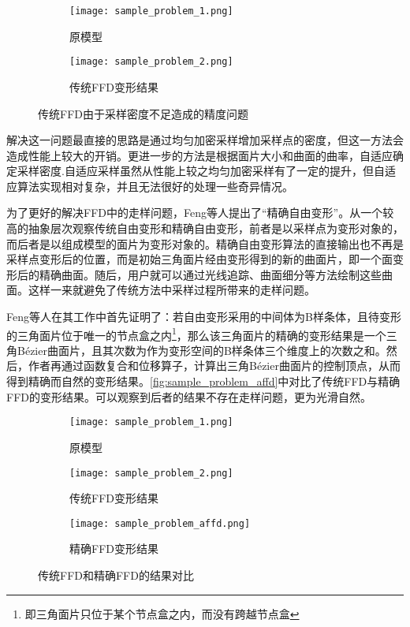 \begin{figure}[htbp]
	\centering
	\begin{subfigure}[b]{.4\textwidth}
		\centering
		\texttt{[image: sample\_problem\_1.png]}
		\caption{原模型}\label{subfig:sample_problem_0}
	\end{subfigure}
	\quad
	\begin{subfigure}[b]{.4\textwidth}
		\centering
		\texttt{[image: sample\_problem\_2.png]}
		\caption{传统FFD变形结果}\label{subfig:sample_problem_1}
	\end{subfigure}
    \caption{传统FFD由于采样密度不足造成的精度问题}\label{fig:sample_problem}
\end{figure}

    解决这一问题最直接的思路是通过均匀加密采样增加采样点的密度，但这一方法会造成性能上较大的开销。更进一步的方法\cite{parry1986, gain1999, griessmair1989deformation}是根据面片大小和曲面的曲率，自适应确定采样密度.自适应采样虽然从性能上较之均匀加密采样有了一定的提升，但自适应算法实现相对复杂，并且无法很好的处理一些奇异情况。

    为了更好的解决FFD中的走样问题，Feng等人\cite{Feng98}提出了“精确自由变形”。从一个较高的抽象层次观察传统自由变形和精确自由变形，前者是以采样点为变形对象的，而后者是以组成模型的面片为变形对象的。精确自由变形算法的直接输出也不再是采样点变形后的位置，而是初始三角面片经由变形得到的新的曲面片，即一个面变形后的精确曲面。随后，用户就可以通过光线追踪、曲面细分等方法绘制这些曲面。这样一来就避免了传统方法中采样过程所带来的走样问题。

    Feng等人在其工作中首先证明了：若自由变形采用的中间体为B样条体，且待变形的三角面片位于唯一的节点盒之内\footnote{即三角面片只位于某个节点盒之内，而没有跨越节点盒}，那么该三角面片的精确的变形结果是一个三角Bézier曲面片，且其次数为作为变形空间的B样条体三个维度上的次数之和。然后，作者再通过函数复合\cite{derose1988, derose1993}和位移算子\cite{chang1984}，计算出三角Bézier曲面片的控制顶点，从而得到精确而自然的变形结果。\autoref{fig:sample_problem_affd}中对比了传统FFD与精确FFD的变形结果。可以观察到后者的结果不存在走样问题，更为光滑自然。

\begin{figure}[htbp]
	\centering
	\begin{subfigure}[b]{.3\textwidth}
		\centering
		\texttt{[image: sample\_problem\_1.png]}
		\caption{原模型}
	\end{subfigure}
	\quad
	\begin{subfigure}[b]{.3\textwidth}
		\centering
		\texttt{[image: sample\_problem\_2.png]}
		\caption{传统FFD变形结果}
	\end{subfigure}
	\quad
	\begin{subfigure}[b]{.3\textwidth}
		\centering
		\texttt{[image: sample\_problem\_affd.png]}
		\caption{精确FFD变形结果}
	\end{subfigure}
    \caption{传统FFD和精确FFD的结果对比}\label{fig:sample_problem_affd}
\end{figure}

